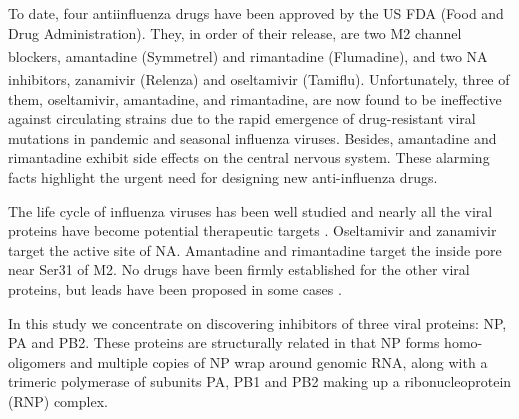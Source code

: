 To date, four antiinfluenza drugs have been approved by the US FDA (Food and Drug Administration). They, in order of their release, are two M2 channel blockers, amantadine (Symmetrel\textsuperscript{\textregistered}) and rimantadine (Flumadine\textsuperscript{\textregistered}), and two NA inhibitors, zanamivir (Relenza\textsuperscript{\textregistered}) and oseltamivir (Tamiflu\textsuperscript{\textregistered}). Unfortunately, three of them, oseltamivir, amantadine, and rimantadine, are now found to be ineffective against circulating strains due to the rapid emergence of drug-resistant viral mutations in pandemic and seasonal influenza viruses. Besides, amantadine and rimantadine exhibit side effects on the central nervous system. These alarming facts highlight the urgent need for designing new anti-influenza drugs.

The life cycle of influenza viruses has been well studied \citep{1539,1522,1525} and nearly all the viral proteins have become potential therapeutic targets \citep{1539,1519,1229,1523,1525}. Oseltamivir and zanamivir target the active site of NA. Amantadine and rimantadine target the inside pore near Ser31 of M2. No drugs have been firmly established for the other viral proteins, but leads have been proposed in some cases \citep{1229,1522,1523,1525}.

In this study we concentrate on discovering inhibitors of three viral proteins: NP, PA and PB2. These proteins are structurally related in that NP forms homo-oligomers and multiple copies of NP wrap around genomic RNA, along with a trimeric polymerase of subunits PA, PB1 and PB2 making up a ribonucleoprotein (RNP) complex.




